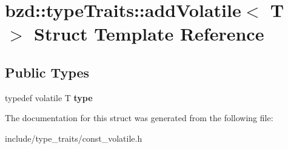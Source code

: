 \hypertarget{structbzd_1_1typeTraits_1_1addVolatile}{}\section{bzd\+:\+:type\+Traits\+:\+:add\+Volatile$<$ T $>$ Struct Template Reference}
\label{structbzd_1_1typeTraits_1_1addVolatile}
\subsection*{Public Types}
\begin{DoxyCompactItemize}
\item 
\mbox{\label{structbzd_1_1typeTraits_1_1addVolatile_a705b367d9908c5fadaa76a60b447b408}} 
typedef volatile T {\bfseries type}
\end{DoxyCompactItemize}


The documentation for this struct was generated from the following file\+:\begin{DoxyCompactItemize}
\item 
include/type\+\_\+traits/const\+\_\+volatile.\+h\end{DoxyCompactItemize}
